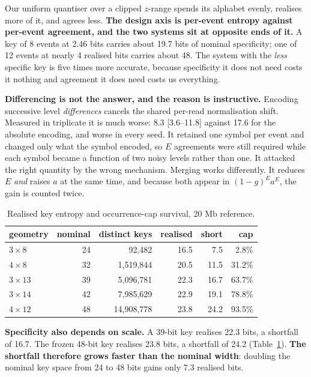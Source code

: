 \documentclass[conference]{IEEEtran}
\begin{document}
Our uniform quantiser over a clipped $z$-range spends its alphabet evenly, realises more of it,
and agrees less. \textbf{The design axis is per-event entropy against per-event agreement, and
the two systems sit at opposite ends of it.} A key of 8 events at 2.46 bits carries about 19.7
bits of nominal specificity; one of 12 events at nearly 4 realised bits carries about 48. The
system with the \emph{less} specific key is five times more accurate, because specificity it
does not need costs it nothing and agreement it does need costs us everything.

\textbf{Differencing is not the answer, and the reason is instructive.} Encoding successive
level \emph{differences} cancels the shared per-read normalisation shift. Measured in triplicate
it is much worse: 8.3 [3.6--11.8] against 17.6 for the absolute encoding, and worse in every
seed. It retained one symbol per event and changed only what the symbol encoded, so $E$
agreements were still required while each symbol became a function of two noisy levels rather
than one. It attacked the right quantity by the wrong mechanism. Merging works differently. It
reduces $E$ \emph{and} raises $a$ at the same time, and because both appear in
$(1-g)^{E} a^{E}$, the gain is counted twice.

\begin{table}[t]
\caption{Realised key entropy and occurrence-cap survival, 20 Mb reference.}
\label{tab:entropy}
\centering
\scriptsize
\begin{tabular}{lrrrrr}
\toprule
geometry & nominal & distinct keys & realised & short & cap \\
\midrule
$3 \times 8$  & 24 & 92,482     & 16.5 & 7.5  & 2.8\%  \\
$4 \times 8$  & 32 & 1,519,844  & 20.5 & 11.5 & 31.2\% \\
$3 \times 13$ & 39 & 5,096,781  & 22.3 & 16.7 & 63.7\% \\
$3 \times 14$ & 42 & 7,985,629  & 22.9 & 19.1 & 78.8\% \\
$4 \times 12$ & 48 & 14,908,778 & 23.8 & 24.2 & 93.5\% \\
\bottomrule
\end{tabular}
\end{table}

\textbf{Specificity also depends on scale.} A 39-bit key realises 22.3 bits, a shortfall of
16.7. The frozen 48-bit key realises 23.8 bits, a shortfall of 24.2 (Table~\ref{tab:entropy}).
\textbf{The shortfall therefore grows faster than the nominal width}: doubling the nominal key
space from 24 to 48 bits gains only 7.3 realised bits.
\end{document}
